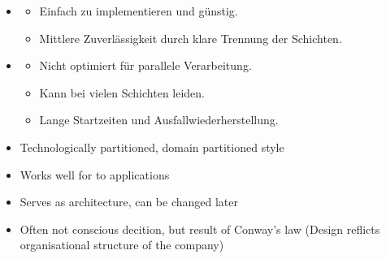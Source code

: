 \begin{infoBox}[title=Architectural Style: Layered (Trade-offs)]
    \begin{itemize}
        \item {}
        \begin{itemize}
            \item {} Einfach zu implementieren und günstig.
            \item {} Mittlere Zuverlässigkeit durch klare Trennung der Schichten.
        \end{itemize}
        \item {}
        \begin{itemize}
            \item {} Nicht optimiert für parallele Verarbeitung.
            \item {} Kann bei vielen Schichten leiden.
            \item {} Lange Startzeiten und Ausfallwiederherstellung.
        \end{itemize}
    \end{itemize}
\end{infoBox}
\begin{defBox}[title=Summary]
    \begin{itemize}
        \item Technologically partitioned,  domain partitioned style
        \item Works well for  to  applications
        \item Serves as  architecture, can be changed later
        \item {} Often not conscious decition, but result of Conway's law (Design reflicts organisational structure of the company)
    \end{itemize}
\end{defBox}
